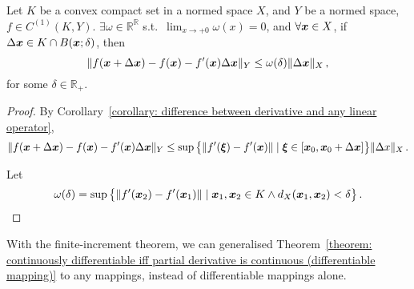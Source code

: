 \documentclass[openany]{book}
\begin{document}
\begin{theorem}
	Let $K$ be a convex compact set in a normed space $X$, and $Y$ be a normed space, $f \in C^{(1)}(K, Y)$. 
	$\exists \omega \in \mathbb R^\mathbb R$ s.t.\ $\lim_{x \to + 0} \omega(x) = 0$, and $\forall \boldsymbol{x} \in X$, if $\Delta \boldsymbol{x} \in K \cap B(\boldsymbol{x}; \delta)$, then
	\begin{equation*}
		\|f(\boldsymbol{x} + \Delta \boldsymbol{x}) - f(\boldsymbol{x}) - f'(\boldsymbol{x}) \Delta \boldsymbol{x}\|_Y
			\leq \omega(\delta) \|\Delta \boldsymbol{x}\|_X\,,
	\end{equation*}
	for some $\delta \in \mathbb R_+$.
\end{theorem}
\begin{proof}
	By Corollary~\ref{corollary: difference between derivative and any linear operator}, 
	\begin{equation*}
		\|f(\boldsymbol{x} + \Delta \boldsymbol{x}) - f(\boldsymbol{x}) - f'(\boldsymbol{x}) \Delta \boldsymbol{x}\|_Y
			\leq \sup \big\{\|f'(\boldsymbol{\xi}) - f'(\boldsymbol{x})\|  
				\mid \boldsymbol{\xi} \in [\boldsymbol{x}_0, \boldsymbol{x}_0 + \Delta \boldsymbol{x}]\big\}
				\|\Delta x\|_X\,.
	\end{equation*}

	Let
	\begin{equation*}
		\omega(\delta) 
		= \sup\big\{\|f'(\boldsymbol{x}_2) - f'(\boldsymbol{x}_1)\| \mid \boldsymbol{x}_1, \boldsymbol{x}_2 \in K 
			\wedge d_X(\boldsymbol{x}_1, \boldsymbol{x}_2) < \delta\big\}\,.
	\end{equation*}
\end{proof}

With the finite-increment theorem, we can generalised Theorem~\ref{theorem: continuously differentiable iff partial derivative is continuous (differentiable mapping)} to any mappings, instead of differentiable mappings alone.
\end{document}
